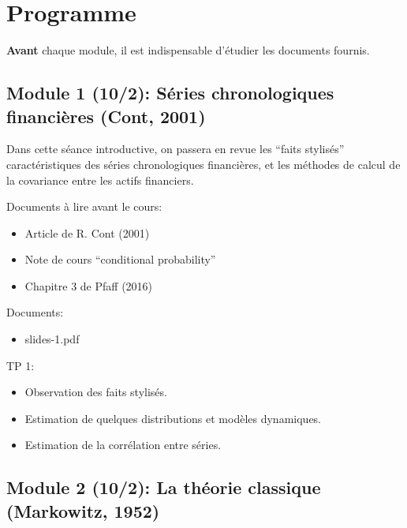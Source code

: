 \documentclass[
  11pt,
]{article}
\providecommand{\tightlist}{%
  \setlength{\itemsep}{0pt}\setlength{\parskip}{0pt}}
\begin{document}
\hypertarget{programme}{%
\section{Programme}\label{programme}}

\textbf{Avant} chaque module, il est indispensable d'étudier les
documents fournis.

\hypertarget{module-1-102-suxe9ries-chronologiques-financiuxe8res-cont2001}{%
\subsection{Module 1 (10/2): Séries chronologiques financières (Cont,
2001)}\label{module-1-102-suxe9ries-chronologiques-financiuxe8res-cont2001}}

Dans cette séance introductive, on passera en revue les ``faits
stylisés'' caractéristiques des séries chronologiques financières, et
les méthodes de calcul de la covariance entre les actifs financiers.

Documents à lire avant le cours:

\begin{itemize}
\tightlist
\item
  Article de R. Cont (2001)
\item
  Note de cours ``conditional probability''
\item
  Chapitre 3 de Pfaff (2016)
\end{itemize}

Documents:

\begin{itemize}
\tightlist
\item
  slides-1.pdf
\end{itemize}

TP 1:

\begin{itemize}
\tightlist
\item
  Observation des faits stylisés.
\item
  Estimation de quelques distributions et modèles dynamiques.
\item
  Estimation de la corrélation entre séries.
\end{itemize}

\hypertarget{module-2-102-la-thuxe9orie-classique-markowitz1952}{%
\subsection{Module 2 (10/2): La théorie classique (Markowitz,
1952)}\label{module-2-102-la-thuxe9orie-classique-markowitz1952}}
\end{document}

